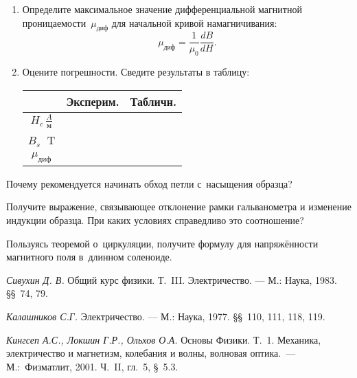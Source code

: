 \begin{lab:task}
\begin{enumerate}
		\item Определите максимальное значение дифференциальной магнитной проницаемости~$\mu_{диф}$ для начальной кривой
		намагничивания:
		\begin{equation*}
			\mu_{диф}=\frac{1}{\mu_0}\frac{dB}{dH}.
		\end{equation*}
		
		\item Оцените погрешности. Сведите результаты в таблицу:
		
		\begin{center}
		\begin{tabular}{|c|c|c|}
		\hline
		&Эксперим.&Табличн.\\
		\hline\hline
		$H_c\,\frac{A}{м}$& & \\
		$B_s\;$ T & & \\
		$\mu_{диф}$ & & \\
		\hline
		\end{tabular}
		\end{center}

	\end{enumerate}

\end{lab:task}

\begin{lab:questions}
	
	\item Почему рекомендуется начинать обход петли с~насыщения образца?
	
	\item Получите выражение, связывающее отклонение рамки гальванометра и изменение индукции образца. При каких условиях
	справедливо это соотношение?
	
	\item Пользуясь теоремой о~циркуляции, получите формулу для напряжённости магнитного поля в~длинном соленоиде.

\end{lab:questions}

\begin{lab:literature}
	
	\item \emph{Сивухин Д. В.} Общий курс физики. Т.~III. Электричество. --- М.: Наука, 1983. \S\S~74, 79.
	
	\item \emph{Калашников С.Г.} Электричество. --- М.: Наука, 1977. \S\S~110, 111, 118, 119.
	
	\item \emph{Кингсеп А.С., Локшин Г.Р., Ольхов О.А.} Основы Физики. Т.~1. Механика, электричество и магнетизм, колебания и
	волны, волновая оптика.~--- М.:~Физматлит, 2001. Ч.~II, гл.~5, \S~5.3.
	
\end{lab:literature}
